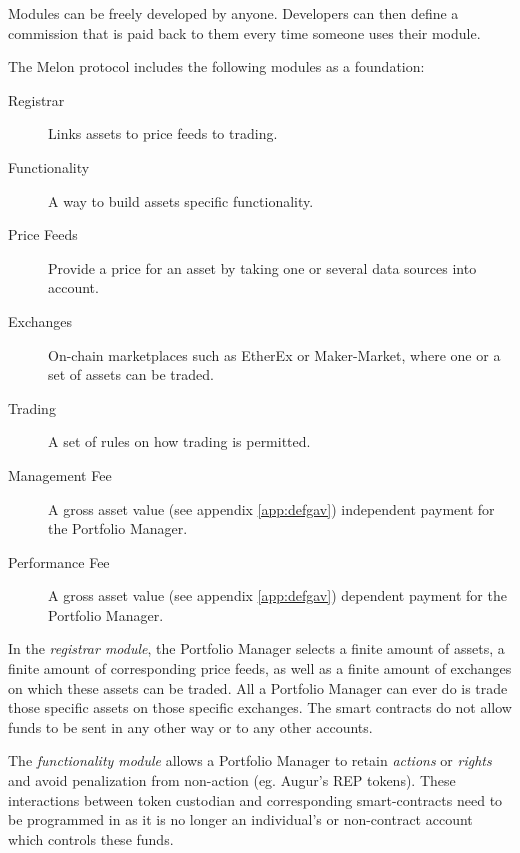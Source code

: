 \documentclass[9pt,oneside]{amsart}
\theoremstyle{plain}
\begin{document}
\begin{multicols}{2}
    Modules can be freely developed by anyone. Developers can then define a commission that is paid back to them every time someone uses their module.
    
    The Melon protocol includes the following modules as a foundation:
    
    \begin{description}
        \item[Registrar] Links assets to price feeds to trading.
        \item[Functionality] A way to build assets specific functionality.
        \item[Price Feeds] Provide a price for an asset by taking one or several data sources into account.    
        \item[Exchanges] On-chain marketplaces such as EtherEx\cite{etherex} or Maker-Market\cite{maker-market}, where one or a set of assets can be traded.
        \item[Trading] A set of rules on how trading is permitted.
        \item[Management Fee] A gross asset value (see appendix \ref{app:defgav}) independent payment for the Portfolio Manager.
        \item[Performance Fee] A gross asset value (see appendix \ref{app:defgav}) dependent payment for the Portfolio Manager.
    \end{description}
    
    In the \textit{registrar module}, the Portfolio Manager selects a finite amount of assets, a finite amount of corresponding price feeds, as well as a finite amount of exchanges on which these assets can be traded. All a Portfolio Manager can ever do is trade those specific assets on those specific exchanges. The smart contracts do not allow funds to be sent in any other way or to any other accounts. 
    
    The \textit{functionality module} allows a Portfolio Manager to retain \textit{actions} or \textit{rights} and avoid penalization from non-action (eg. Augur’s REP tokens). These interactions between token custodian and corresponding smart-contracts need to be programmed in as it is no longer an individual's or non-contract account which controls these funds.
    

\end{multicols}
\end{document}

